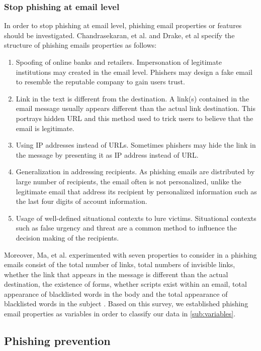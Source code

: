 \subsubsection{\label{sub:Stop-phishing-at}Stop phishing at email level}

In order to stop phishing at email level, phishing email properties
or features should be investigated. Chandrasekaran, et al. and Drake,
et al \citep{chandrasekaran:2006,drake2004anatomy} specify the structure
of phishing emails properties as follows:
\begin{enumerate}
\item Spoofing of online banks and retailers. Impersonation of legitimate
institutions may created in the email level. Phishers may design a
fake email to resemble the reputable company to gain users trust.
\item Link in the text is different from the destination. A link(s) contained
in the email message usually appears different than the actual link
destination. This portrays hidden URL and this method used to trick
users to believe that the email is legitimate.
\item Using IP addresses instead of URLs. Sometimes phishers may hide the
link in the message by presenting it as IP address instead of URL.
\item Generalization in addressing recipients. As phishing emails are distributed
by large number of recipients, the email often is not personalized,
unlike the legitimate email that address its recipient by personalized
information such as the last four digits of account information.
\item Usage of well-defined situational contexts to lure victims. Situational
contexts such as false urgency and threat are a common method to influence
the decision making of the recipients.
\end{enumerate}
Moreover, Ma, et al. experimented with seven properties to consider
in a phishing emails consist of the total number of links, total numbers
of invisible links, whether the link that appears in the message is
different than the actual destination, the existence of forms, whether
scripts exist within an email, total appearance of blacklisted words
in the body and the total appearance of blacklisted words in the subject
\citep{ma2009detecting}. Based on this survey, we established phishing
email properties as variables in order to classify our data in \autoref{sub:variables}.


\subsection{Phishing prevention}

